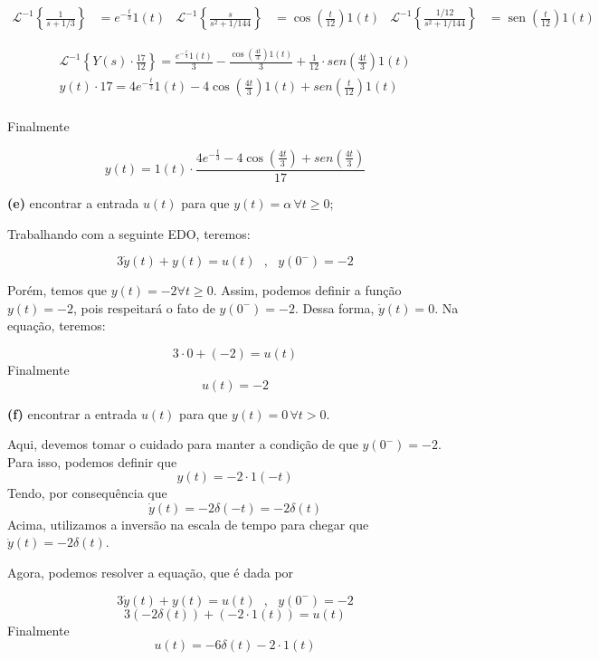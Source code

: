 \documentclass{article}
\DeclareMathOperator{\sen}{sen}
\begin{document}
\begin{align*}
    \mathcal{L}^{-1} \left\{\frac{1}{s + 1/3}\right\} &= e^{-\frac{t}{3}}1(t) & \mathcal{L}^{-1} \left\{\frac{s}{s^2 + 1/144}\right\} &= \cos\left(\frac{t}{12}\right)1(t) & \mathcal{L}^{-1} \left\{\frac{1/12}{s^2 + 1/144}\right\} &= \sen\left(\frac{t}{12}\right)1(t)
\end{align*}

\begin{align*}
    \mathcal{L}^{-1} \left\{Y(s) \cdot \frac{17}{12}\right\} = \frac{e^{-\frac{t}{3}}1(t)}{3} - \frac{\cos\left(\frac{4t}{3}\right)1(t)}{3} + \frac{1}{12}\cdot sen\left(\frac{4t}{3}\right)1(t)\\
    y(t) \cdot 17 = 4e^{-\frac{t}{3}}1(t) - 4\cos\left(\frac{4t}{3}\right)1(t) + sen\left(\frac{t}{12}\right)1(t)\\
\end{align*}

Finalmente

\[y(t) = 1(t)\cdot\frac{4e^{-\frac{t}{3}} - 4\cos\left(\frac{4t}{3}\right) + sen\left(\frac{4t}{3}\right)}{17}\]

\textbf{(e)} encontrar a entrada $u(t)$ para que $y(t) = \alpha\,\forall t \geq 0$;

Trabalhando com a seguinte EDO, teremos:

\[3\dot{y}(t) + y(t) = u(t)\,\,\,\,,\,\,\,\,y(0^-) = -2\]

Porém, temos que $y(t) = -2 \forall t \geq 0$. Assim, podemos definir a função $y(t) = -2$, pois respeitará o fato de $y(0^-) = -2$. Dessa forma, $\dot{y}(t) = 0$. Na equação, teremos:

\[3\cdot 0 + (-2) = u(t)\]
Finalmente
\[u(t) = -2\]

\textbf{(f)} encontrar a entrada $u(t)$ para que  $y(t) = 0\,\forall t > 0$.

Aqui, devemos tomar o cuidado para manter a condição de que $y(0^-) = -2$. Para isso, podemos definir que
\[y(t) = -2 \cdot 1(-t)\]
Tendo, por consequência que
\[\dot{y}(t) = -2\delta(-t) = -2\delta(t)\]
Acima, utilizamos a inversão na escala de tempo para chegar que $\dot{y}(t) = -2\delta(t)$.

Agora, podemos resolver a equação, que é dada por

\[3\dot{y}(t) + y(t) = u(t)\,\,\,\,,\,\,\,\,y(0^-) = -2\]
\[3(-2\delta(t)) + (-2\cdot 1(t)) = u(t)\]
Finalmente
\[u(t) = -6\delta(t) - 2\cdot 1(t)\]

\vspace{\baselineskip}
\end{document}

